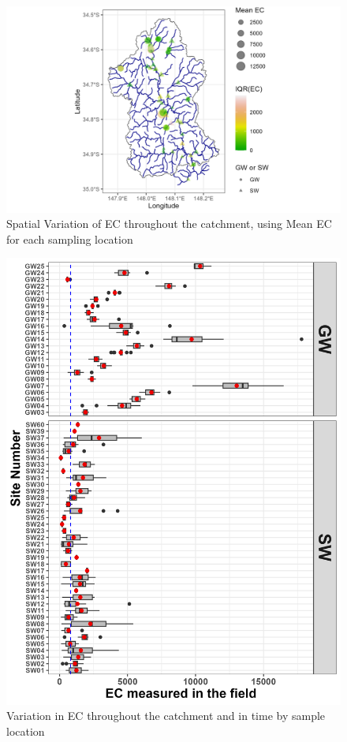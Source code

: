 \documentclass[, manuscript]{copernicus}
\begin{document}
\clearpage

\begin{figure}
\includegraphics[width=0.8\linewidth]{Figures/ec_map} \caption{Spatial Variation of EC throughout the catchment, using Mean EC for each sampling location}\label{fig:ECmap}
\end{figure}

\begin{figure}
\includegraphics[width=0.8\linewidth]{Figures/ec_plot} \caption{Variation in EC throughout the catchment and in time by sample location}\label{fig:ECboxplot}
\end{figure}
\end{document}
